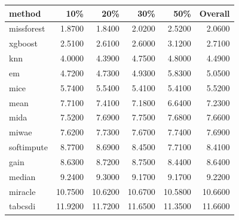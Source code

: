 \begin{tabular}{lrrrrr}
\toprule
method & 10\% & 20\% & 30\% & 50\% & Overall \\
\midrule
missforest & 1.8700 & 1.8400 & 2.0200 & 2.5200 & 2.0600 \\
xgboost & 2.5100 & 2.6100 & 2.6000 & 3.1200 & 2.7100 \\
knn & 4.0000 & 4.3900 & 4.7500 & 4.8000 & 4.4900 \\
em & 4.7200 & 4.7300 & 4.9300 & 5.8300 & 5.0500 \\
mice & 5.7400 & 5.5400 & 5.4100 & 5.4100 & 5.5200 \\
mean & 7.7100 & 7.4100 & 7.1800 & 6.6400 & 7.2300 \\
mida & 7.5200 & 7.6900 & 7.7500 & 7.6800 & 7.6600 \\
miwae & 7.6200 & 7.7300 & 7.6700 & 7.7400 & 7.6900 \\
softimpute & 8.7700 & 8.6900 & 8.4500 & 7.7100 & 8.4100 \\
gain & 8.6300 & 8.7200 & 8.7500 & 8.4400 & 8.6400 \\
median & 9.2400 & 9.3000 & 9.1700 & 9.1700 & 9.2200 \\
miracle & 10.7500 & 10.6200 & 10.6700 & 10.5800 & 10.6600 \\
tabcsdi & 11.9200 & 11.7200 & 11.6500 & 11.3500 & 11.6600 \\
\bottomrule
\end{tabular}
